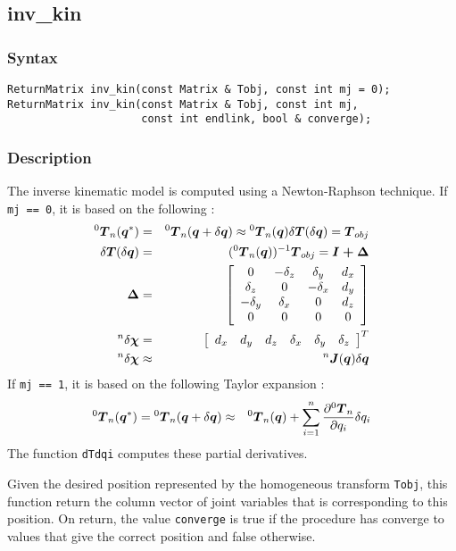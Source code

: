 \documentclass[11pt,fleqn,letterpaper]{report}
\newcommand{\mbold}[1]{\mbox{\boldmath $ #1 $}}
\newcommand{\matr}[2]{\left[\begin{array}{#1} #2 \end{array}\right]}
\newcommand{\dfdx}[2]{\frac{\partial #1}{\partial #2}}
\begin{document}
\newpage

\subsection*{inv\_kin}
\subsubsection*{Syntax}
\begin{verbatim}
ReturnMatrix inv_kin(const Matrix & Tobj, const int mj = 0);
ReturnMatrix inv_kin(const Matrix & Tobj, const int mj, 
                     const int endlink, bool & converge);
\end{verbatim}
\subsubsection*{Description}
The inverse kinematic model is computed using a Newton-Raphson technique. 
If {\tt mj == 0}, it is based on the following \cite{Gorla84}:
\begin{eqnarray}
{}^0 \mbold{T}_n (\mbold{q}^*) & = & {}^0 \mbold{T}_n (\mbold{q} + \delta \mbold{q})
\approx {}^0 \mbold{T}_n (\mbold{q}) \delta \mbold{T} ( \delta \mbold{q}) =  \mbold{T}_{obj} \\
\delta \mbold{T} ( \delta \mbold{q}) & = & ({}^0 \mbold{T}_n (\mbold{q}))^{-1} \mbold{T}_{obj} = 
\mbold{I + \Delta} \\
\mbold{\Delta} & = & \matr{cccc}{
0 & -\delta_z & \delta_y & d_x \\
\delta_z & 0 & -\delta_x & d_y \\
-\delta_y & \delta_x & 0 & d_z \\
0 & 0 & 0 & 0} \\
{}^n \delta \mbold{\chi} & = & \matr{cccccc}{
d_x & d_y & d_z & \delta_x & \delta_y & \delta_z 
}^T \\
{}^n \delta \mbold{\chi} & \approx & {}^n \mbold{J}(\mbold{q}) \delta \mbold{q}
\end{eqnarray}
If {\tt mj == 1}, it is based on 
the following Taylor expansion \cite{Gorla84,Uicker67}:
\begin{eqnarray}
{}^0 \mbold{T}_n (\mbold{q}^*) & = {}^0 \mbold{T}_n (\mbold{q} + \delta \mbold{q}) \approx & 
{}^0 \mbold{T}_n (\mbold{q}) + \sum_{i=1}^{n} \dfdx{{}^0 \mbold{T}_n}{q_i} \delta q_i
\end{eqnarray}
The function {\tt dTdqi} computes these partial derivatives.

Given the desired position represented by the homogeneous transform
{\tt Tobj}, this function return the column vector of joint variables
that is corresponding to this position. On return, the value
\texttt{converge} is true if the procedure has converge to values that
give the correct position and false otherwise.
\end{document}
